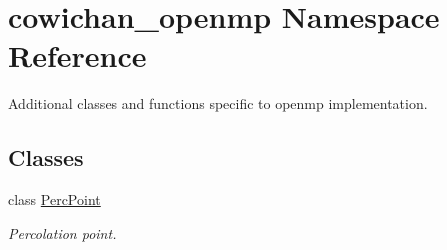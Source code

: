 \hypertarget{namespacecowichan__openmp}{
\section{cowichan\_\-openmp Namespace Reference}
\label{namespacecowichan__openmp}
}
Additional classes and functions specific to openmp implementation.  


\subsection*{Classes}
\begin{CompactItemize}
\item 
class \hyperlink{classcowichan__openmp_1_1_perc_point}{PercPoint}
\begin{CompactList}\small\item\em Percolation point. \item\end{CompactList}\end{CompactItemize}
